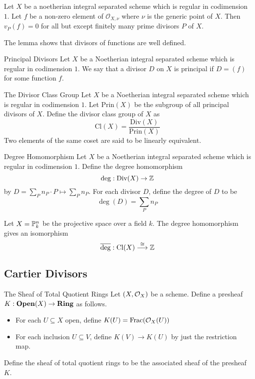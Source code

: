 \documentclass[a4paper]{article}
\begin{document}
\begin{lmm}{}{} Let $X$ be a noetherian integral separated scheme which is regular in codimension $1$. Let $f$ be a non-zero element of $\mathcal{O}_{X,\nu}$ where $\nu$ is the generic point of $X$. Then $v_P(f)=0$ for all but except finitely many prime divisors $P$ of $X$. 
\end{lmm}

The lemma shows that divisors of functions are well defined. 

\begin{defn}{Principal Divisors}{} Let $X$ be a Noetherian integral separated scheme which is regular in codimension $1$. We say that a divisor $D$ on $X$ is principal if $D=(f)$ for some function $f$. 
\end{defn}

\begin{defn}{The Divisor Class Group}{} Let $X$ be a Noetherian integral separated scheme which is regular in codimension $1$. Let $\text{Prin}(X)$ be the subgroup of all principal divisors of $X$. Define the divisor class group of $X$ as $$\text{Cl}(X)=\frac{\text{Div}(X)}{\text{Prin}(X)}$$ Two elements of the same coset are said to be linearly equivalent. 
\end{defn}

\begin{defn}{Degree Homomorphism}{} Let $X$ be a Noetherian integral separated scheme which is regular in codimension $1$. Define the degree homomorphism $$\deg:\text{Div}(X)\to\mathbb{Z}$$ by $D=\sum_Pn_P\cdot P\mapsto\sum_Pn_P$. For each divisor $D$, define the degree of $D$ to be $$\deg(D)=\sum_Pn_P$$
\end{defn}

\begin{lmm}{}{} Let $X=\mathbb{P}_k^n$ be the projective space over a field $k$. The degree homomorphism gives an isomorphism $$\overline{\deg}:\text{Cl}(X)\overset{\cong}{\longrightarrow}\mathbb{Z}$$
\end{lmm}

\subsection{Cartier Divisors}
\begin{defn}{The Sheaf of Total Quotient Rings}{} Let $(X,\mathcal{O}_X)$ be a scheme. Define a presheaf $K:\bold{Open}(X)\to\bold{Ring}$ as follows. 
\begin{itemize}
\item For each $U\subseteq X$ open, define $K(U)=\text{Frac}(\mathcal{O}_X(U))$
\item For each inclusion $U\subseteq V$, define $K(V)\to K(U)$ by just the restriction map. 
\end{itemize}
Define the sheaf of total quotient rings to be the associated sheaf of the presheaf $K$. 
\end{defn}
\end{document}
